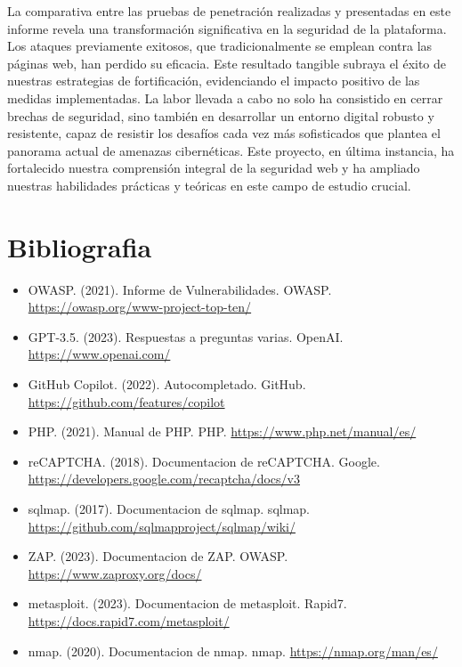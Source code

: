 \documentclass{report}
\begin{document}
        La comparativa entre las pruebas de penetración realizadas y presentadas en este informe revela una transformación significativa en la seguridad de la plataforma. Los ataques previamente exitosos, que tradicionalmente se emplean contra las páginas web, han perdido su eficacia. Este resultado tangible subraya el éxito de nuestras estrategias de fortificación, evidenciando el impacto positivo de las medidas implementadas. La labor llevada a cabo no solo ha consistido en cerrar brechas de seguridad, sino también en desarrollar un entorno digital robusto y resistente, capaz de resistir los desafíos cada vez más sofisticados que plantea el panorama actual de amenazas cibernéticas. Este proyecto, en última instancia, ha fortalecido nuestra comprensión integral de la seguridad web y ha ampliado nuestras habilidades prácticas y teóricas en este campo de estudio crucial.
    \chapter{Bibliografia}
        \begin{itemize}
            \item OWASP. (2021). Informe de Vulnerabilidades. OWASP. \url{https://owasp.org/www-project-top-ten/}
            \item GPT-3.5. (2023). Respuestas a preguntas varias. OpenAI. \url{https://www.openai.com/}
            \item GitHub Copilot. (2022). Autocompletado. GitHub. \url{https://github.com/features/copilot}
            \item PHP. (2021). Manual de PHP. PHP. \url{https://www.php.net/manual/es/}
            \item reCAPTCHA. (2018). Documentacion de reCAPTCHA. Google. \url{https://developers.google.com/recaptcha/docs/v3}
            \item sqlmap. (2017). Documentacion de sqlmap. sqlmap. \url{https://github.com/sqlmapproject/sqlmap/wiki/}
            \item ZAP. (2023). Documentacion de ZAP. OWASP. \url{https://www.zaproxy.org/docs/}
            \item metasploit. (2023). Documentacion de metasploit. Rapid7. \url{https://docs.rapid7.com/metasploit/}
            \item nmap. (2020). Documentacion de nmap. nmap. \url{https://nmap.org/man/es/}
        \end{itemize}
\end{document}
